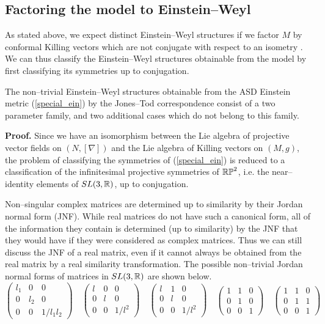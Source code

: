 \subsection{Factoring the model to Einstein--Weyl}
\label{neat2}
As stated above, we expect distinct Einstein--Weyl structures if we factor $M$ by conformal Killing vectors which are not conjugate with respect to an isometry \cite{PT}. We can thus classify the Einstein--Weyl structures obtainable from the model by first classifying its symmetries up to conjugation.
\begin{prop}
The non--trivial Einstein--Weyl structures obtainable from the ASD Einstein metric (\ref{special_ein}) by the Jones--Tod correspondence consist of a two parameter family, and two additional cases which do not belong to this family.
\end{prop}
\noindent
{\bf Proof. }Since we have an isomorphism between the Lie algebra of projective vector fields on $(N,[\nabla])$ and the Lie algebra of Killing vectors on $(M,g)$, the problem of classifying the symmetries of (\ref{special_ein}) is reduced to a classification of the infinitesimal  projective symmetries of $\mathbb{RP}^2$, i.e. the near--identity elements of $SL(3,\mathbb{R})$, up to conjugation.

Non--singular complex matrices are determined up to similarity by their Jordan normal form (JNF). While real matrices do not have such a canonical form, all of the information they contain is determined (up to similarity) by the JNF that they would have if they were considered as complex matrices. Thus we can still discuss the JNF of a real matrix, even if it cannot always be obtained from the real matrix by a real similarity transformation. The possible non--trivial Jordan normal forms of matrices in $SL(3,\mathbb{R})$ are shown below.
\[
\begin{pmatrix}l_1 & 0 & 0\\
0 & l_2 & 0\\
0 & 0 & 1/l_1l_2
\end{pmatrix}
\quad
\begin{pmatrix} l & 0 & 0\\
0 &  l & 0\\
0 & 0 & 1/ l^2
\end{pmatrix}
\quad
\begin{pmatrix} l & 1 & 0\\
0 &  l & 0\\
0 & 0 & 1/ l^2
\end{pmatrix}
\quad
\begin{pmatrix}1 & 1 & 0\\
0 & 1 & 0\\
0 & 0 & 1
\end{pmatrix}
\quad
\begin{pmatrix}1 & 1 & 0\\
0 & 1 & 1\\
0 & 0 & 1
\end{pmatrix}
\]


